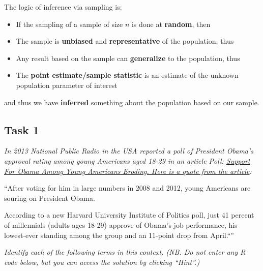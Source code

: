\documentclass[]{article}
\providecommand{\tightlist}{%
  \setlength{\itemsep}{0pt}\setlength{\parskip}{0pt}}
\begin{document}
The logic of inference via sampling is:

\begin{itemize}
\tightlist
\item
  If the sampling of a sample of size \(n\) is done at \textbf{random},
  then
\item
  The sample is \textbf{unbiased} and \textbf{representative} of the
  population, thus
\item
  Any result based on the sample can \textbf{generalize} to the
  population, thus
\item
  The \textbf{point estimate/sample statistic} is an estimate of the
  unknown population parameter of interest
\end{itemize}

and thus we have \textbf{inferred} something about the population based
on our sample.

\subsection{Task 1}\label{task-1}

\emph{In 2013 National Public Radio in the USA reported a poll of
President Obama's approval rating among young Americans aged 18-29 in an
article Poll:
\href{https://www.npr.org/sections/itsallpolitics/2013/12/04/248793753/poll-support-for-obama-among-young-americans-eroding?t=1550838418397}{Support
For Obama Among Young Americans Eroding. Here is a quote from the
article}:}

``After voting for him in large numbers in 2008 and 2012, young
Americans are souring on President Obama.

According to a new Harvard University Institute of Politics poll, just
41 percent of millennials (adults ages 18-29) approve of Obama's job
performance, his lowest-ever standing among the group and an 11-point
drop from April.``''

\emph{Identify each of the following terms in this context. (NB. Do not
enter any R code below, but you can access the solution by clicking
``Hint''.)}
\end{document}
